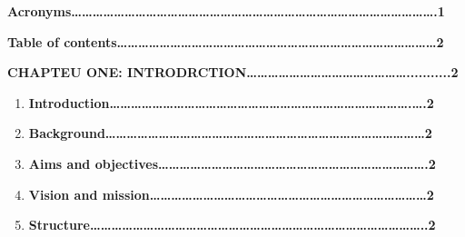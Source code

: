 \documentclass[16pt]{article}
\begin{document}
{\raggedright
\textbf{Acronyms\ldots{}\ldots{}\ldots{}\ldots{}\ldots{}\ldots{}\ldots{}\ldots{}\ldots{}\ldots{}\ldots{}\ldots{}\ldots{}\ldots{}\ldots{}\ldots{}\ldots{}\ldots{}\ldots{}\ldots{}\ldots{}\ldots{}\ldots{}\ldots{}\ldots{}\ldots{}\ldots{}\ldots{}\ldots{}\ldots{}\ldots{}\ldots{}\ldots{}\ldots{}.1}
}

{\raggedright
\textbf{Table of
contents\ldots{}\ldots{}\ldots{}\ldots{}\ldots{}\ldots{}\ldots{}\ldots{}\ldots{}\ldots{}\ldots{}\ldots{}\ldots{}\ldots{}\ldots{}\ldots{}\ldots{}\ldots{}\ldots{}\ldots{}\ldots{}\ldots{}\ldots{}\ldots{}\ldots{}\ldots{}\ldots{}\ldots{}\ldots{}\ldots{}2}
}

{\raggedright
\textbf{CHAPTEU ONE:         
INTRODRCTION\ldots{}\ldots{}\ldots{}\ldots{}\ldots{}\ldots{}\ldots{}\ldots{}\ldots{}\ldots{}\ldots{}\ldots{}\ldots{}\ldots{}\ldots{}...........2}
}

\begin{enumerate}
	\item \textbf{Introduction\ldots{}\ldots{}\ldots{}\ldots{}\ldots{}\ldots{}\ldots{}\ldots{}\ldots{}\ldots{}\ldots{}\ldots{}\ldots{}\ldots{}\ldots{}\ldots{}\ldots{}\ldots{}\ldots{}\ldots{}\ldots{}\ldots{}\ldots{}\ldots{}\ldots{}\ldots{}\ldots{}\ldots{}.\ldots{}.2}
	\item \textbf{Background\ldots{}\ldots{}\ldots{}\ldots{}\ldots{}\ldots{}\ldots{}\ldots{}\ldots{}\ldots{}\ldots{}\ldots{}\ldots{}\ldots{}\ldots{}\ldots{}\ldots{}\ldots{}\ldots{}\ldots{}\ldots{}\ldots{}\ldots{}\ldots{}\ldots{}\ldots{}\ldots{}\ldots{}\ldots{}\ldots{}2}
	\item \textbf{Aims and
objectives\ldots{}\ldots{}\ldots{}\ldots{}\ldots{}\ldots{}\ldots{}\ldots{}\ldots{}\ldots{}\ldots{}\ldots{}\ldots{}\ldots{}\ldots{}\ldots{}\ldots{}\ldots{}\ldots{}\ldots{}\ldots{}\ldots{}\ldots{}\ldots{}\ldots{}.2}
	\item \textbf{Vision and
mission\ldots{}\ldots{}\ldots{}\ldots{}\ldots{}\ldots{}\ldots{}\ldots{}\ldots{}\ldots{}\ldots{}\ldots{}\ldots{}\ldots{}\ldots{}\ldots{}\ldots{}\ldots{}\ldots{}\ldots{}\ldots{}\ldots{}\ldots{}\ldots{}\ldots{}\ldots{}2}
	\item \textbf{Structure\ldots{}\ldots{}\ldots{}\ldots{}\ldots{}\ldots{}\ldots{}\ldots{}\ldots{}\ldots{}\ldots{}\ldots{}\ldots{}\ldots{}\ldots{}\ldots{}\ldots{}\ldots{}\ldots{}\ldots{}\ldots{}\ldots{}\ldots{}\ldots{}\ldots{}\ldots{}\ldots{}\ldots{}\ldots{}\ldots{}\ldots{}..2}
\end{enumerate}
\end{document}
